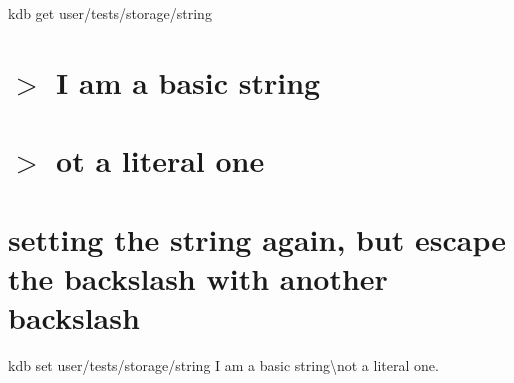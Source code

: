 kdb get \textquotesingle{}user/tests/storage/string\textquotesingle{} \hypertarget{autotoc_md693_autotoc_md743}{}\section{$>$ I am a basic string}\label{autotoc_md693_autotoc_md743}
\hypertarget{autotoc_md693_autotoc_md744}{}\section{$>$ ot a literal one}\label{autotoc_md693_autotoc_md744}
\hypertarget{autotoc_md693_autotoc_md745}{}\section{setting the string again, but escape the backslash with another backslash}\label{autotoc_md693_autotoc_md745}
kdb set \textquotesingle{}user/tests/storage/string\textquotesingle{} \textquotesingle{}I am a basic string\textbackslash{}not a literal one.\textquotesingle{}

